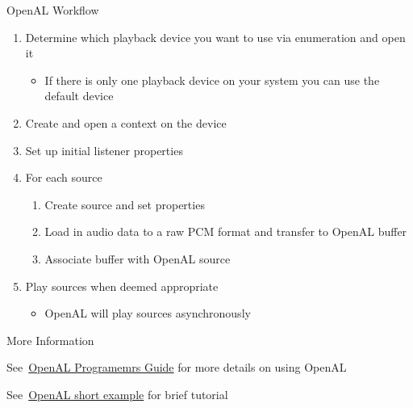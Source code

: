 \documentclass{beamer}
\newcommand{\hrefhand}[2]{\raisebox{-0.4ex}{\HandRight}\,\href{#1}{#2}}
\begin{document}
\begin{frame}[fragile]{OpenAL Workflow}
    \begin{enumerate}
        \item Determine which playback device you want to use via enumeration and open it
              \begin{itemize}
                  \item If there is only one playback device on your system you can use the default device
              \end{itemize}
        \item Create and open a context on the device
        \item Set up initial listener properties
        \item For each source
              \begin{enumerate}
                  \item Create source and set properties
                  \item Load in audio data to a raw PCM format and transfer to OpenAL buffer
                  \item Associate buffer with OpenAL source
              \end{enumerate}
        \item Play sources when deemed appropriate
              \begin{itemize}
                  \item OpenAL will play sources asynchronously
              \end{itemize}
    \end{enumerate}
\end{frame}

\begin{frame}[fragile]{More Information}
    \begin{examples}
        See \hrefhand{https://www.openal.org/documentation/OpenAL_Programmers_Guide.pdf}{\color{blue}OpenAL Programemrs Guide} for more details on using OpenAL
    \end{examples}

    \begin{examples}
        See \hrefhand{https://ffainelli.github.io/openal-example/}{\color{blue}OpenAL short example} for brief tutorial
    \end{examples}
\end{frame}
\end{document}
